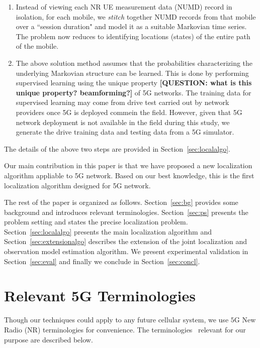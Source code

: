 \documentclass[conference, 10pt]{IEEEtran}
\begin{document}
\begin{enumerate}
    \item Instead of viewing each NR UE measurement data (NUMD) record in isolation, for each mobile, we {\em stitch}
together NUMD records from that mobile over a ``session
duration"  and model it as a suitable Markovian time series. The problem now
reduces to identifying locations (states) of the entire path of
the mobile.

\item The above solution method assumes that the probabilities characterizing the
    underlying Markovian structure can be learned. This is done by performing supervised learning using the unique property \textbf{[QUESTION: what is this unique property? beamforming?]} of 5G networks.
The training data for supervised learning may come from
drive test carried out by network providers once 5G is deployed commein the field. However, given that 5G network deployment is not available in the field during this study, we generate the drive training data and testing data from a 5G simulator.
	
\end{enumerate}

The details of the above two steps are provided in Section~\ref{sec:localalgo}.


Our main contribution in this paper is that we have proposed a new localization algorithm
appliable to 5G network. Based on our best knowledge, this is the first localization algorithm designed for 5G network. 


The rest of the paper is organized as follows. Section~\ref{sec:bg} provides some
background and introduces relevant terminologies. Section~\ref{sec:ps} presents
the problem setting and states the precise localization problem.
Section~\ref{sec:localalgo}
presents the main localization algorithm and Section~\ref{sec:extensionalgo} describes the extension of the joint localization and observation model estimation algorithm. 
We present experimental validation in Section~\ref{sec:eval} and finally we conclude in
Section~\ref{sec:concl}.




\section{Relevant 5G Terminologies}
Though our techniques could apply to any future cellular system, we use $5$G New Radio (NR) 
terminologies for convenience. The terminologies~\cite{3gpp38series} relevant for our purpose are described below.
\end{document}
